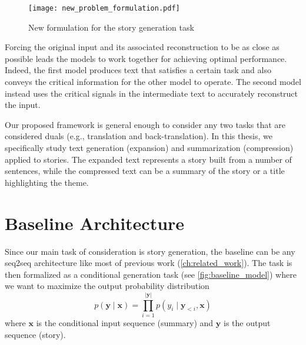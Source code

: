 \begin{figure}[ht]
\centering
\texttt{[image: new\_problem\_formulation.pdf]}
\caption{New formulation for the story generation task}
\label{fig:new_problem_formulation}
\end{figure}

Forcing the original input and its associated reconstruction to be as close as possible leads the models to work together for achieving optimal performance. Indeed, the first model produces text that satisfies a certain task and also conveys the critical information for the other model to operate. The second model instead uses the critical signals in the intermediate text to accurately reconstruct the input. 

Our proposed framework is general enough to consider any two tasks that are considered duals (e.g., translation and back-translation). In this thesis, we specifically study text generation (expansion) and summarization (compression) applied to stories. The expanded text represents a story built from a number of sentences, while the compressed text can be a summary of the story or a title highlighting the theme.



\section{Baseline Architecture}
\label{sec:baseline_arch}


Since our main task of consideration is story generation, the baseline can be any seq2seq architecture like most of previous work (\cref{ch:related_work}). The task is then formalized as a conditional generation task (see \cref{fig:baseline_model}) where we want to maximize the output probability distribution
\[ p(\mathbf{y} \mid \mathbf{x}) = \prod_{i=1}^{|\mathbf{y}|} p(y_i \mid \mathbf{y}_{<i}, \mathbf{x})  \]
where $\mathbf{x}$ is the conditional input sequence (summary) and $\mathbf{y}$ is the output sequence (story).

